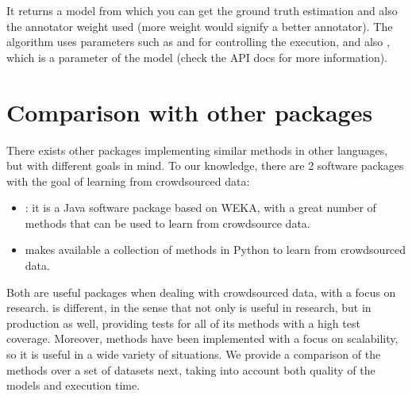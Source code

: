 \documentclass[letterpaper,10pt,english]{sphinxmanual}
\begin{document}
It returns a model from which you can get the ground truth estimation and
also the annotator weight used (more weight would signify a better annotator).
The algorithm uses parameters such as  and  for
controlling the execution, and also , which is a parameter of the model
(check the API docs for more information).


\chapter{Comparison with other packages}
\label{\detokenize{package/other:comparison-with-other-packages}}\label{\detokenize{package/other:comparison}}\label{\detokenize{package/other::doc}}
There exists other packages implementing similar methods in other languages, but with
different goals in mind. To our knowledge, there are 2 software packages with the goal
of learning from crowdsourced data:
\begin{itemize}
\item {} 
: it is a Java software package based on WEKA, with
a great number of methods that can be used to learn from crowdsource data.

\item {} 
 makes available a collection
of methods in Python to learn from crowdsourced data.

\end{itemize}

Both are useful packages when dealing with crowdsourced data, with a focus on research.  is different, in the sense that
not only is useful in research, but in production as well, providing tests for all of its methods with a high test coverage. Moreover,
methods have been implemented with a focus on scalability, so it is useful in a wide variety of situations. We provide a
comparison of the methods over a set of datasets next, taking into account both quality of the models and execution time.
\end{document}
